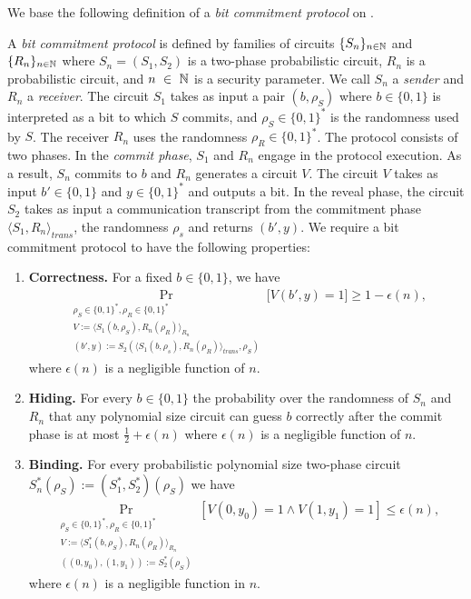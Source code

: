 We base the following definition of a \textit{bit commitment protocol} on \cite{LectureNotesComThCrypto}.
\begin{definition}
  \label{def:bit_commitment}
A \textit{bit commitment protocol} is defined by families of circuits $\{S_n\}_{n \in \mathbb{N}}$ and $\{R_n\}_{n \in \mathbb{N}}$
where $S_n = (S_1, S_2)$ is a two-phase probabilistic circuit, $R_n$ is a probabilistic circuit, and
$n~\in~\mathbb{N}$ is a security parameter. We call $S_n$ a \textit{sender} and $R_n$ a \textit{receiver}.
The circuit $S_1$ takes as input a pair $(b, \rho_S)$ where $b \in \{0,1\}$ is interpreted as a bit to which $S$ commits, and $\rho_S \in \{0,1\}^{*}$ is the randomness used by $S$.
The receiver $R_n$ uses the randomness $\rho_R \in \{0,1\}^{*}$.
The protocol consists of two phases. In the \textit{commit phase}, $S_1$ and $R_n$ engage in the protocol execution.
As a result, $S_n$ commits to $b$ and $R_n$ generates a circuit $V$.
The circuit $V$ takes as input $b' \in \{0,1\}$ and $y \in \{0,1\}^{*}$ and outputs a bit.
In the \textnormal{reveal phase}, the circuit $S_2$ takes as input a communication transcript from the commitment phase
$\langle S_1, R_n \rangle_{\mathit{trans}}$, the randomness $\rho_s$ and returns $(b', y)$.
We require a bit commitment protocol to have the following properties:
\begin{enumerate}[]
\item{\textnormal{\textbf{Correctness.}}} For a fixed $b \in \{0,1\}$, we have
  \begin{align*}
    \underset{\substack{\rho_S \in \{0,1\}^{*}, \rho_R \in \{0,1\}^{*} \\
        V := \langle S_1(b,\rho_S), R_n(\rho_R) \rangle_{R_n} \\
        (b',y) := S_2(\langle S_1(b,\rho_s), R_n(\rho_R) \rangle_{\mathit{trans}},\rho_S)}}{\Pr}\Big[V(b',y) = 1 \Big] \geq 1 - \epsilon(n),
  \end{align*}
where $\epsilon(n)$ is a negligible function of $n$.
\item{\textnormal{\textbf{Hiding.}}}
  For every $b \in \{0,1\}$ the probability over the randomness of $S_n$ and $R_n$ that any polynomial size circuit
  can guess $b$ correctly after the commit phase is at most $\frac{1}{2} + \epsilon(n)$ where $\epsilon(n)$ is a negligible function of $n$.
\item{\textnormal{\textbf{Binding.}}}
  For every probabilistic polynomial size two-phase circuit $S_n^*(\rho_S) := (S^*_1, S^*_2)(\rho_S)$ we have
  \begin{align*}
    \underset{\substack{
        \rho_S \in \{0,1\}^{*}, \rho_R \in \{0,1\}^{*} \\
        V := \langle S_1^*(b,\rho_S), R_n(\rho_R) \rangle_{R_n} \\ ((0, y_0), (1, y_1)) := S_2^*(\rho_S)}}{\Pr}[V(0,y_0) = 1 \land V(1,y_1) = 1] \leq \epsilon(n),
  \end{align*}
  where $\epsilon(n)$ is a negligible function in $n$.
\end{enumerate}
\end{definition}

